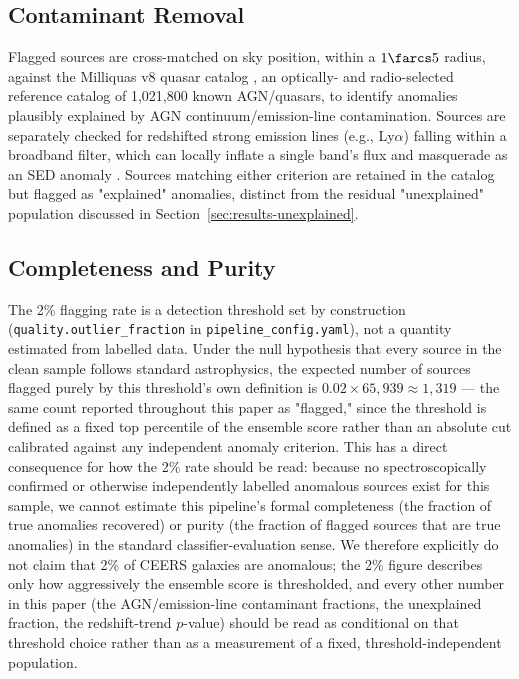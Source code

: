 \documentclass[twocolumn]{aastex631}
\begin{document}
\subsection{Contaminant Removal}
\label{sec:contaminant-removal}

Flagged sources are cross-matched on sky position, within a $1\farcs5$
radius, against the Milliquas v8 quasar catalog \citep{Flesch2023}, an
optically- and radio-selected reference catalog of 1,021,800 known
AGN/quasars, to identify anomalies plausibly explained by AGN
continuum/emission-line contamination. Sources are separately checked for
redshifted strong emission lines (e.g., Ly$\alpha$) falling within a
broadband filter, which can locally inflate a single band's flux and
masquerade as an SED anomaly \citep{Meusinger2012}. Sources matching either
criterion are retained in the catalog but flagged as "explained" anomalies,
distinct from the residual "unexplained" population discussed in
Section~\ref{sec:results-unexplained}.

\subsection{Completeness and Purity}
\label{sec:completeness-purity}

The 2\% flagging rate is a detection threshold set by construction
(\texttt{quality.outlier\_fraction} in \texttt{pipeline\_config.yaml}), not
a quantity estimated from labelled data. Under the null hypothesis that
every source in the clean sample follows standard astrophysics, the
expected number of sources flagged purely by this threshold's own
definition is $0.02 \times 65{,}939 \approx 1{,}319$ --- the same count
reported throughout this paper as "flagged," since the threshold is
defined as a fixed top percentile of the ensemble score rather than an
absolute cut calibrated against any independent anomaly criterion. This
has a direct consequence for how the 2\% rate should be read: because no
spectroscopically confirmed or otherwise independently labelled anomalous
sources exist for this sample, we cannot estimate this pipeline's formal
completeness (the fraction of true anomalies recovered) or purity (the
fraction of flagged sources that are true anomalies) in the standard
classifier-evaluation sense. We therefore explicitly do not claim that 2\%
of CEERS galaxies are anomalous; the 2\% figure describes only
how aggressively the ensemble score is thresholded, and every other number
in this paper (the AGN/emission-line contaminant fractions, the
unexplained fraction, the redshift-trend $p$-value) should be read as
conditional on that threshold choice rather than as a measurement of a
fixed, threshold-independent population.
\end{document}
